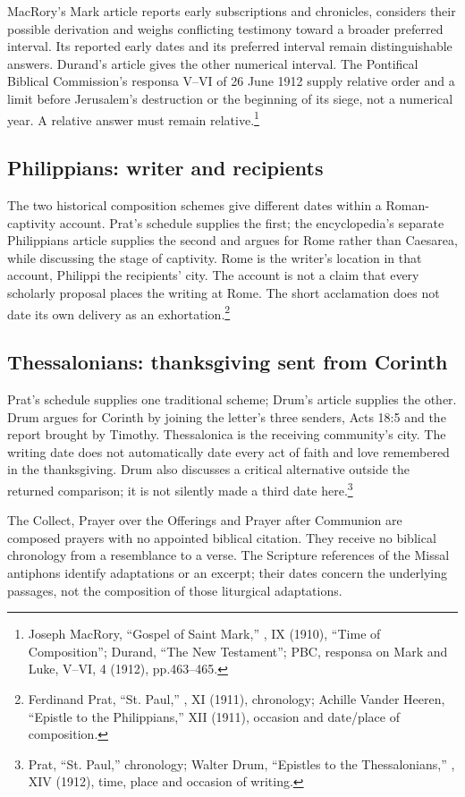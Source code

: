MacRory's Mark article reports early subscriptions and chronicles, considers their possible derivation and weighs conflicting testimony toward a broader preferred interval. Its reported early dates and its preferred interval remain distinguishable answers. Durand's  article gives the other numerical interval. The Pontifical Biblical Commission's responsa V--VI of 26 June 1912 supply relative order and a limit before Jerusalem's destruction or the beginning of its siege, not a numerical year. A relative answer must remain relative.\footnote{Joseph MacRory, ``Gospel of Saint Mark,'' , IX (1910), ``Time of Composition''; Durand, ``The New Testament''; PBC, responsa on Mark and Luke, V--VI,  4 (1912), pp.463--465.}

\subsection{Philippians: writer and recipients}
\label{history-philippians}

The two historical composition schemes give different dates within a Roman-captivity account. Prat's schedule supplies the first; the encyclopedia's separate Philippians article supplies the second and argues for Rome rather than Caesarea, while discussing the stage of captivity. Rome is the writer's location in that account, Philippi the recipients' city. The account is not a claim that every scholarly proposal places the writing at Rome. The short acclamation does not date its own delivery as an exhortation.\footnote{Ferdinand Prat, ``St. Paul,'' , XI (1911), chronology; Achille Vander Heeren, ``Epistle to the Philippians,'' XII (1911), occasion and date/place of composition.}

\subsection{Thessalonians: thanksgiving sent from Corinth}
\label{history-thessalonians}

Prat's schedule supplies one traditional scheme; Drum's article supplies the other. Drum argues for Corinth by joining the letter's three senders, Acts 18:5 and the report brought by Timothy. Thessalonica is the receiving community's city. The writing date does not automatically date every act of faith and love remembered in the thanksgiving. Drum also discusses a critical alternative outside the returned comparison; it is not silently made a third date here.\footnote{Prat, ``St. Paul,'' chronology; Walter Drum, ``Epistles to the Thessalonians,'' , XIV (1912), time, place and occasion of writing.}

The Collect, Prayer over the Offerings and Prayer after Communion are composed prayers with no appointed biblical citation. They receive no biblical chronology from a resemblance to a verse. The Scripture references of the Missal antiphons identify adaptations or an excerpt; their dates concern the underlying passages, not the composition of those liturgical adaptations.
